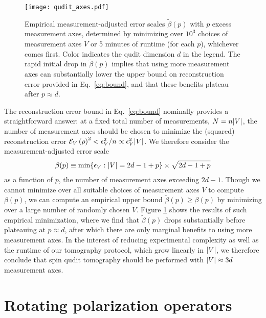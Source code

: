 \documentclass[notitlepage,twocolumn]{revtex4-2}
\newcommand{\p}[1]{\left(#1\right)} %
\renewcommand{\set}[1]{\{#1\}} %
\newcommand{\E}{\mathcal{E}}
\begin{document}
\begin{figure}
  \centering
  \texttt{[image: qudit\_axes.pdf]}
  \caption{Empirical measurement-adjusted error scales $\tilde\beta(p)$ with $p$ excess measurement axes, determined by minimizing over $10^3$ choices of measurement axes $V$ or 5 minutes of runtime (for each $p$), whichever comes first.
    Color indicates the qudit dimension $d$ in the legend.
    The rapid initial drop in $\tilde\beta(p)$ implies that using more measurement axes can substantially lower the upper bound on reconstruction error provided in Eq.~\eqref{eq:bound}, and that these benefits plateau after $p\approx d$.}
  \label{fig:axes}
\end{figure}

The reconstruction error bound in Eq.~\eqref{eq:bound} nominally provides a straightforward answer: at a fixed total number of measurements, $N=n\abs{V}$, the number of measurement axes should be chosen to minimize the (squared) reconstruction error $\E_V\p{\rho}^2<\epsilon_V^2/n\propto\epsilon_V^2\abs{V}$.
We therefore consider the measurement-adjusted error scale
\begin{align}
  \beta(p)
  \equiv \min\set{\epsilon_V:\abs{V}=2d-1+p} \times \sqrt{2d-1+p}
\end{align}
as a function of $p$, the number of measurement axes exceeding $2d-1$.
Though we cannot minimize over all suitable choices of measurement axes $V$ to compute $\beta(p)$, we can compute an empirical upper bound $\tilde\beta(p)\ge\beta(p)$ by minimizing over a large number of randomly chosen $V$.
Figure \ref{fig:axes} shows the results of such empirical minimization, where we find that $\tilde\beta(p)$ drops substantially before plateauing at $p\approx d$, after which there are only marginal benefits to using more measurement axes.
In the interest of reducing experimental complexity as well as the runtime of our tomography protocol, which grow linearly in $\abs{V}$, we therefore conclude that spin qudit tomography should be performed with $\abs{V}\approx3d$ measurement axes.



\onecolumngrid
\appendix

\section{Rotating polarization operators}
\label{sec:rotations}
\end{document}
